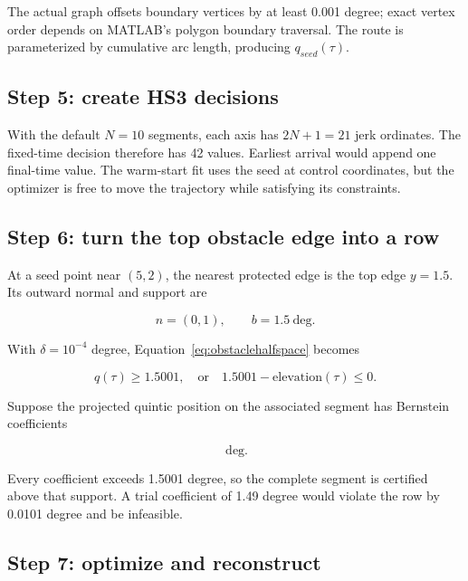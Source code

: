 \documentclass[10pt,letterpaper]{article}
\begin{document}
The actual graph offsets boundary vertices by at least 0.001 degree; exact
vertex order depends on MATLAB's polygon boundary traversal. The route is
parameterized by cumulative arc length, producing $q_{seed}(\tau)$.

\subsection{Step 5: create HS3 decisions}

With the default $N=10$ segments, each axis has $2N+1=21$ jerk ordinates.
The fixed-time decision therefore has 42 values. Earliest arrival would append
one final-time value. The warm-start fit uses the seed at control coordinates,
but the optimizer is free to move the trajectory while satisfying its
constraints.

\subsection{Step 6: turn the top obstacle edge into a row}

At a seed point near $(5,2)$, the nearest protected edge is the top edge
$y=1.5$. Its outward normal and support are

\begin{equation}
n=(0,1),\qquad b=1.5\ \mathrm{deg}.
\end{equation}

With $\delta=10^{-4}$ degree, Equation~\eqref{eq:obstaclehalfspace} becomes

\begin{equation}
[0\ \ 1]q(\tau)\ge1.5001,
\quad\text{or}\quad 1.5001-\mathrm{elevation}(\tau)\le0.
\end{equation}

Suppose the projected quintic position on the associated segment has
Bernstein coefficients

\begin{equation}
[2.00,1.80,1.65,1.70,1.90,2.00]\ \mathrm{deg}.
\end{equation}

Every coefficient exceeds 1.5001 degree, so the complete segment is certified
above that support. A trial coefficient of 1.49 degree would violate the row by
0.0101 degree and be infeasible.

\subsection{Step 7: optimize and reconstruct}
\end{document}
